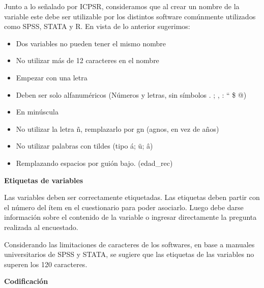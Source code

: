 \documentclass[
  spanish,
  letterpaper,
  DIV=11,
  numbers=noendperiod]{scrreprt}
\begin{document}
Junto a lo señalado por ICPSR, consideramos que al crear un nombre de la
variable este debe ser utilizable por los distintos software comúnmente
utilizados como SPSS, STATA y R. En vista de lo anterior sugerimos:

\begin{itemize}
\item
  Dos variables no pueden tener el mismo nombre
\item
  No utilizar más de 12 caracteres en el nombre
\item
  Empezar con una letra
\item
  Deben ser solo alfanuméricos (Números y letras, sin símbolos . ; , :
  `` \$ @)
\item
  En minúscula
\item
  No utilizar la letra ñ, remplazarlo por gn (agnos, en vez de años)
\item
  No utilizar palabras con tildes (tipo á; ü; â)
\item
  Remplazando espacios por guión bajo. (edad\_rec)
\end{itemize}

\textbf{Etiquetas de variables}

Las variables deben ser correctamente etiquetadas. Las etiquetas deben
partir con el número del ítem en el cuestionario para poder asociarlo.
Luego debe darse información sobre el contenido de la variable o
ingresar directamente la pregunta realizada al encuestado.

Considerando las limitaciones de caracteres de los softwares, en base a
manuales universitarios de SPSS y STATA, se sugiere que las etiquetas de
las variables no superen los 120 caracteres.

\textbf{Codificación}
\end{document}
